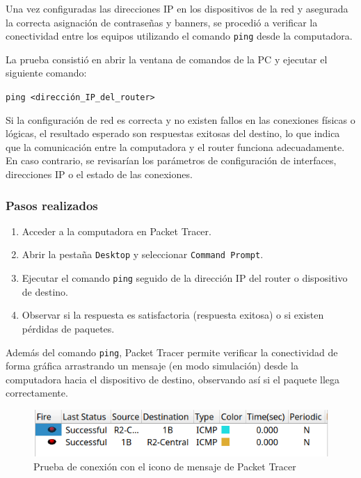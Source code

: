 \documentclass[a4paper,11pt]{article}
\begin{document}
Una vez configuradas las direcciones IP en los dispositivos de la red y
asegurada la correcta asignación de contraseñas y banners, se procedió a
verificar la conectividad entre los equipos utilizando el comando \texttt{ping}
desde la computadora.

La prueba consistió en abrir la ventana de comandos de la PC y ejecutar el
siguiente comando:

\begin{center}
    \texttt{ping <dirección\_IP\_del\_router>}
\end{center}

Si la configuración de red es correcta y no existen fallos en las conexiones
físicas o lógicas, el resultado esperado son respuestas exitosas del destino,
lo que indica que la comunicación entre la computadora y el router funciona
adecuadamente. En caso contrario, se revisarían los parámetros de configuración
de interfaces, direcciones IP o el estado de las conexiones.

\subsubsection*{Pasos realizados}
\begin{enumerate}
    \item Acceder a la computadora en Packet Tracer.
    \item Abrir la pestaña \texttt{Desktop} y seleccionar \texttt{Command Prompt}.
    \item Ejecutar el comando \texttt{ping} seguido de la dirección IP del router o
          dispositivo de destino.
    \item Observar si la respuesta es satisfactoria (respuesta exitosa) o si existen
          pérdidas de paquetes.
\end{enumerate}

Además del comando \texttt{ping}, Packet Tracer permite verificar la
conectividad de forma gráfica arrastrando un mensaje (en modo simulación) desde
la computadora hacia el dispositivo de destino, observando así si el paquete
llega correctamente. \vspace{1cm}

\begin{figure}[h]
    \includegraphics[width=1\textwidth]{images/connectivity_test.png}
    \caption{Prueba de conexión con el icono de mensaje de Packet Tracer}
\end{figure}
\end{document}
